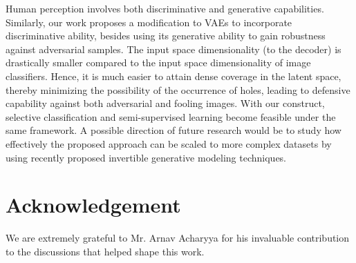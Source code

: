 \documentclass[letterpaper]{article} %
\begin{document}
Human perception involves both discriminative and generative capabilities. Similarly, our work proposes a modification to VAEs to incorporate discriminative ability, besides using its generative ability to gain robustness against adversarial samples. The input space dimensionality (to the decoder) is drastically smaller compared to the input space dimensionality of image classifiers. Hence, it is much easier to attain dense coverage in the latent space, thereby minimizing the possibility of the occurrence of holes, leading to defensive capability against both adversarial and fooling images. With our construct, selective classification and semi-supervised learning become feasible under the same framework. A possible direction of future research would be to study how effectively the proposed approach can be scaled to more complex datasets by using recently proposed invertible generative modeling techniques.

\section{Acknowledgement}
We are extremely grateful to Mr. Arnav Acharyya for his invaluable contribution to the discussions that helped shape this work.


\end{document}
